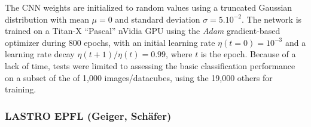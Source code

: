 \documentclass[useAMS,usenatbib]{mnras}
\begin{document}
The CNN weights are initialized to random values using a truncated Gaussian distribution with mean $\mu=0$ and standard deviation $\sigma=5.10^{-2}$. The network is trained on a Titan-X ``Pascal'' nVidia GPU using the \textit{Adam} gradient-based optimizer during 800 epochs, with an initial learning rate $\eta(t=0)=10^{-3}$ and a learning rate decay $\eta(t+1)/\eta(t)=0.99$, where $t$ is the epoch. Because of a lack of time, tests were limited to assessing the basic classification performance on a subset of the of 1,000 images/datacubes, using the 19,000 others for training.


\subsubsection{LASTRO EPFL (Geiger, Sch\"{a}fer)}
\end{document}
